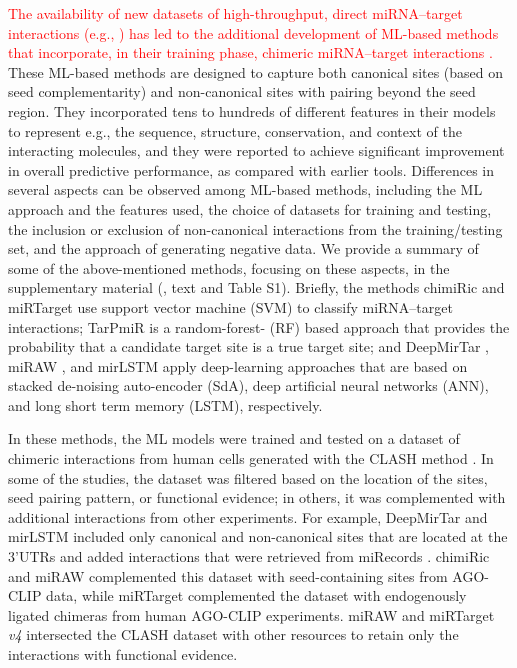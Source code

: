 \documentclass{bmcart}
\begin{document}
\textcolor{red}{The availability of new datasets of high-throughput, direct miRNA--target interactions (e.g., \cite{scheel2017global, grosswendt2014unambiguous, darnell_moore2015mirna, helwak2013mapping}) has led to the additional development of ML-based methods that incorporate, in their training phase, chimeric miRNA--target interactions \cite{lu2016learning, ding2016tarpmir, pla2018miraw, wen2018deepmirtar, paker2019mirlstm,wang2016improving,liu2019prediction}.} These ML-based methods are designed to capture both canonical sites (based on seed complementarity) and non-canonical sites with pairing beyond the seed region. They incorporated tens to hundreds of different features in their models to represent e.g., the sequence, structure, conservation, and context of the interacting molecules, and they were reported to achieve significant improvement in overall predictive performance, as compared with earlier tools. Differences in several aspects can be observed among ML-based methods, including the ML approach and the features used, the choice of datasets for training and testing, the inclusion or exclusion of non-canonical interactions from the training/testing set, and the approach of generating negative data. We provide a summary of some of the above-mentioned methods, focusing on these aspects, in the supplementary material (, text and Table S1). 
Briefly, the methods chimiRic \cite{lu2016learning} and miRTarget \cite{wang2016improving,liu2019prediction} use support vector machine (SVM) to classify miRNA--target interactions; TarPmiR \cite{ding2016tarpmir} is a random-forest- (RF) based approach that provides the probability that a candidate target site is a true target site; and DeepMirTar \cite{wen2018deepmirtar}, miRAW \cite{pla2018miraw}, and mirLSTM \cite{paker2019mirlstm} apply deep-learning approaches that are based on stacked de-noising auto-encoder (SdA), deep artificial neural networks (ANN), and long short term memory (LSTM), respectively.  

In these methods, the ML models were trained and tested on a dataset of chimeric interactions from human cells generated with the CLASH method \cite{helwak2013mapping}. In some of the studies, the dataset was filtered based on the location of the sites, seed pairing pattern, or functional evidence; in others, it was complemented with additional interactions from other experiments. For example, DeepMirTar \cite{wen2018deepmirtar} and mirLSTM \cite{paker2019mirlstm} included only canonical and non-canonical sites that are located at the 3'UTRs and added interactions that were retrieved from miRecords \cite{xiao2009mirecords}. 
chimiRic \cite{lu2016learning} and miRAW \cite{pla2018miraw} complemented this dataset with seed-containing sites from AGO-CLIP data, while miRTarget \cite{wang2016improving} complemented the dataset with endogenously ligated chimeras from human AGO-CLIP experiments. miRAW \cite{pla2018miraw} and miRTarget \textit{v4} \cite{liu2019prediction} intersected the CLASH dataset with other resources to retain only the interactions with functional evidence.
\end{document}
